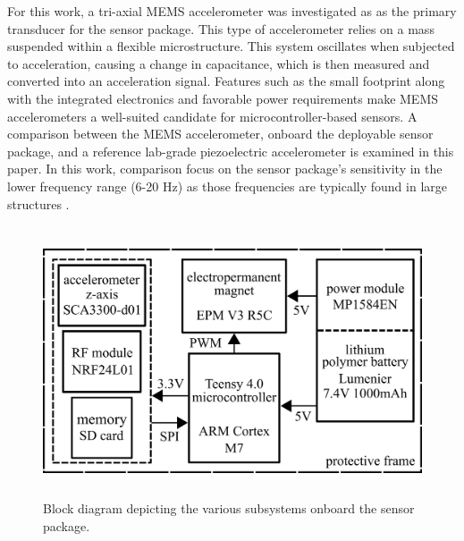 \documentclass[]{spie}  %
\begin{document}
 For this work, a tri-axial MEMS accelerometer was investigated as as the primary transducer for the sensor package. This type of accelerometer relies on a mass suspended within a flexible microstructure. This system oscillates when subjected to acceleration, causing a change in capacitance, which is then measured and converted into an acceleration signal\cite{AYDEMIR2016}. Features such as the small footprint along with the integrated electronics and favorable power requirements make MEMS accelerometers a well-suited candidate for microcontroller-based sensors. A comparison between the MEMS accelerometer, onboard the deployable sensor package, and a reference lab-grade piezoelectric accelerometer is examined in this paper. In this work, comparison focus on the sensor package's sensitivity in the lower frequency range (6-20 Hz) as those frequencies are typically found in large structures \cite{KARPEL1997}.

	
	\begin{figure} [H]
		\centering
		\includegraphics[height=8cm]{figures/SPIE Package Schematic.png}
		\caption{Block diagram depicting the various subsystems onboard the sensor package.}
		\label{fig:SPIE Package Schematic} 
	\end{figure} 	
	
\end{document}
